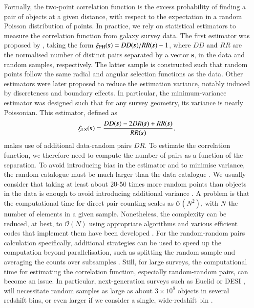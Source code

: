 \documentclass{aa}
\begin{document}
Formally, the two-point correlation function is the excess probability of finding a pair of objects at a given distance, with respect to the expectation in a random Poisson distribution of points. In practice, we rely on statistical estimators to measure the correlation function from galaxy survey data. The first estimator was proposed by \cite{peebles1974statistical}, taking the form $\xi_{\rm PH}(\bm{s}) = DD(\bm{s})/RR(\bm{s}) - 1$, where $DD$ and $RR$ are the normalised number of distinct pairs separated by a vector $\bm{s}$, in the data and random samples, respectively. The latter sample is constructed such that random points follow the same radial and angular selection functions as the data. Other estimators were later proposed \citep{hewett1982correlation, davis1983survey, hamilton1993towards} to reduce the estimation variance, notably induced by discreteness and boundary effects. In particular, the \cite{landy1993bias} minimum-variance estimator was designed such that for any survey geometry, its variance is nearly Poissonian. This estimator, defined as
\begin{equation}
\xi_{\rm LS}(\bm{s}) = \frac{DD(\bm{s})-2DR(\bm{s})+RR(\bm{s})}{RR(\bm{s})},
\end{equation}
makes use of additional data-random pairs $DR$. To estimate the correlation function, we therefore need to compute the number of pairs as a function of the separation. To avoid introducing bias in the estimator and to minimise variance, the random catalogue must be much larger than the data catalogue \citep{landy1993bias,keihanen2019estimating}. We usually consider that taking at least about 20-50 times more random points than objects in the data is enough to avoid introducing additional variance \citep[e.g.][]{samushia2012,delatorre2013vipers,sanchez2017,bautista2021}. A problem is that the computational time for direct pair counting scales as $\mathcal{O}(N^2)$, with $N$ the number of elements in a given sample. Nonetheless, the complexity can be reduced, at best, to $\mathcal{O}(N)$ using appropriate algorithms and various efficient codes that implement them have been developed \citep[e.g.][]{moore2001fast,jarvis2004skewness, alonso2012cute, hearin2017forward, marulli2016cosmobolognalib, slepian2016accelerating, sinha2020corrfunc}. For the random-random pairs calculation specifically, additional strategies can be used to speed up the computation beyond parallelisation, such as splitting the random sample and averaging the counts over subsamples \citep{keihanen2019estimating}. Still, for large surveys, the computational time for estimating the correlation function, especially random-random pairs, can become an issue. In particular, next-generation surveys such as Euclid \citep{laureijs2011euclid} or DESI \citep{desi2016desi}, will necessitate random samples as large as about $3\times10^8$ objects in several redshift bins, or even larger if we consider a single, wide-redshift bin \citep[e.g.][]{mueller2019optimizing, castorina2019redshift}.
\end{document}
